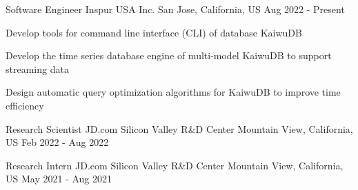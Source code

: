


\begin{cventries}


\cventry
{Software Engineer} %
{Inspur USA Inc.} %
{San Jose, California, US} %
{Aug 2022 - Present} %
{ %
	\begin{cvitems}
		\item {Develop tools for command line interface (CLI) of database KaiwuDB}
		\item {Develop the time series database engine of multi-model KaiwuDB to support streaming data}
		\item {Design automatic query optimization algorithms for KaiwuDB to improve time efficiency}
	\end{cvitems}
}


\cventry
{Research Scientist} %
{JD.com Silicon Valley R\&D Center} %
{Mountain View, California, US} %
{Feb 2022 - Aug 2022} %
{ %
}


\cventry
{Research Intern} %
{JD.com Silicon Valley R\&D Center} %
{Mountain View, California, US} %
{May 2021 - Aug 2021} %
{ %
}


\end{cventries}
